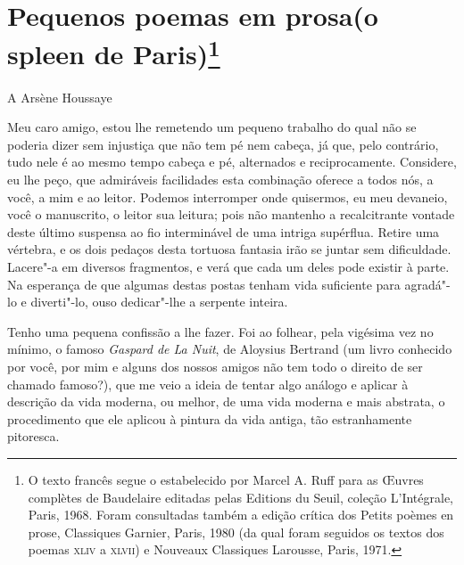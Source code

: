 ﻿


\section*{Pequenos poemas em prosa\break (o spleen de Paris)\protect\footnote{O texto francês segue o estabelecido por Marcel A. Ruff para as {Œuvres 
complètes de Baudelaire} editadas pelas Editions du Seuil, 
coleção L'Intégrale, Paris, 1968. Foram consultadas também a
edição crítica dos {Petits poèmes en prose}, Classiques Garnier, Paris,
1980 (da qual foram seguidos os textos dos poemas \textsc{xliv} a \textsc{xlvii}) e Nouveaux Classiques Larousse, Paris, 1971.}}

A Arsène Houssaye 



Meu caro amigo, estou lhe remetendo um pequeno trabalho do qual não se poderia dizer sem
injustiça que não tem pé nem cabeça, já que, pelo contrário, tudo nele
é ao mesmo tempo cabeça e pé, alternados e reciprocamente. Considere, eu
lhe peço, que admiráveis facilidades esta combinação oferece a todos
nós, a você, a mim e ao leitor. Podemos interromper onde quisermos, eu
meu devaneio, você o manuscrito, o leitor sua leitura; pois não
mantenho a recalcitrante vontade deste último suspensa ao fio
interminável de uma intriga supérflua. Retire uma vértebra, e os dois
pedaços desta tortuosa fantasia irão se juntar sem dificuldade.
Lacere"-a em diversos fragmentos, e verá que cada um deles pode
existir à parte. Na esperança de que algumas destas postas tenham vida
suficiente para agradá"-lo e diverti"-lo, ouso dedicar"-lhe a
serpente inteira.

Tenho uma pequena confissão a lhe fazer. Foi ao folhear, pela vigésima
vez no mínimo, o famoso \textit{Gaspard de La Nuit}, de Aloysius Bertrand (um
livro conhecido por você, por mim e alguns dos nossos amigos não
tem todo o direito de ser chamado famoso?), que me veio a ideia de
tentar algo análogo e aplicar à descrição da vida moderna, ou
melhor, de uma vida moderna e mais abstrata, o procedimento que ele
aplicou à pintura da vida antiga, tão estranhamente pitoresca.

